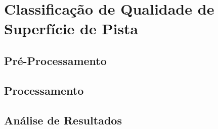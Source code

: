 \chapter{Classificação de Qualidade de Superfície de Pista}
\label{cap:classificacao_qualidade}

\section{Pré-Processamento}
\section{Processamento}
\section{Análise de Resultados}

